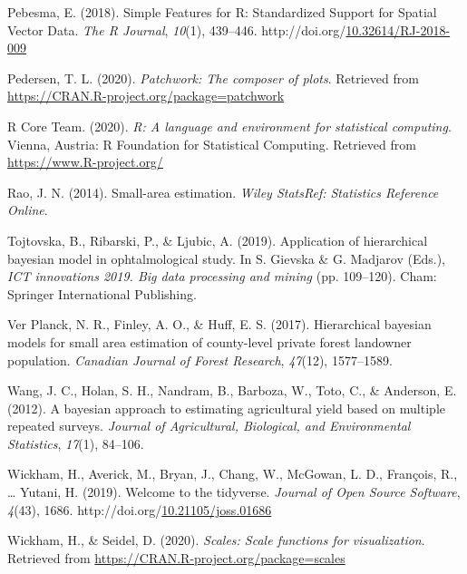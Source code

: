 \documentclass[12pt,twoside]{reedthesis}
\newlength{\cslhangindent}
\newenvironment{CSLReferences}[2] %
 {%
  \setlength{\parindent}{0pt}
  \ifodd #1 \everypar{\setlength{\hangindent}{\cslhangindent}}\ignorespaces\fi
  \ifnum #2 > 0
  \setlength{\parskip}{#2\baselineskip}
  \fi
 }%
 {}
\begin{document}
\begin{CSLReferences}{1}{0}
\leavevmode{}%
Pebesma, E. (2018). {Simple Features for R: Standardized Support for Spatial Vector Data}. \emph{{The R Journal}}, \emph{10}(1), 439--446. http://doi.org/\href{https://doi.org/10.32614/RJ-2018-009}{10.32614/RJ-2018-009}

\leavevmode{}%
Pedersen, T. L. (2020). \emph{Patchwork: The composer of plots}. Retrieved from \url{https://CRAN.R-project.org/package=patchwork}

\leavevmode{}%
R Core Team. (2020). \emph{R: A language and environment for statistical computing}. Vienna, Austria: R Foundation for Statistical Computing. Retrieved from \url{https://www.R-project.org/}

\leavevmode{}%
Rao, J. N. (2014). Small-area estimation. \emph{Wiley StatsRef: Statistics Reference Online}.

\leavevmode{}%
Tojtovska, B., Ribarski, P., \& Ljubic, A. (2019). Application of hierarchical bayesian model in ophtalmological study. In S. Gievska \& G. Madjarov (Eds.), \emph{ICT innovations 2019. Big data processing and mining} (pp. 109--120). Cham: Springer International Publishing.

\leavevmode{}%
Ver Planck, N. R., Finley, A. O., \& Huff, E. S. (2017). Hierarchical bayesian models for small area estimation of county-level private forest landowner population. \emph{Canadian Journal of Forest Research}, \emph{47}(12), 1577--1589.

\leavevmode{}%
Wang, J. C., Holan, S. H., Nandram, B., Barboza, W., Toto, C., \& Anderson, E. (2012). A bayesian approach to estimating agricultural yield based on multiple repeated surveys. \emph{Journal of Agricultural, Biological, and Environmental Statistics}, \emph{17}(1), 84--106.

\leavevmode{}%
Wickham, H., Averick, M., Bryan, J., Chang, W., McGowan, L. D., François, R., \ldots{} Yutani, H. (2019). Welcome to the {tidyverse}. \emph{Journal of Open Source Software}, \emph{4}(43), 1686. http://doi.org/\href{https://doi.org/10.21105/joss.01686}{10.21105/joss.01686}

\leavevmode{}%
Wickham, H., \& Seidel, D. (2020). \emph{Scales: Scale functions for visualization}. Retrieved from \url{https://CRAN.R-project.org/package=scales}

\end{CSLReferences}

\end{document}
